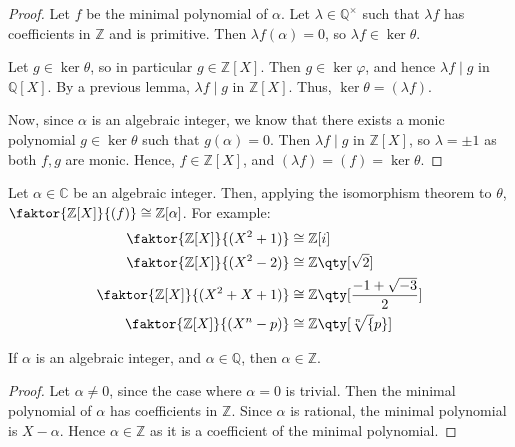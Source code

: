 \begin{proof}
	Let $f$ be the minimal polynomial of $\alpha$.
	Let $\lambda \in \mathbb Q^\times$ such that $\lambda f$ has coefficients in $\mathbb Z$ and is primitive.
	Then $\lambda f(\alpha) = 0$, so $\lambda f \in \ker \theta$.

	Let $g \in \ker \theta$, so in particular $g \in \mathbb Z[X]$.
	Then $g \in \ker \varphi$, and hence $\lambda f \mid g$ in $\mathbb Q[X]$.
	By a previous lemma, $\lambda f \mid g$ in $\mathbb Z[X]$.
	Thus, $\ker \theta = (\lambda f)$.

	Now, since $\alpha$ is an algebraic integer, we know that there exists a monic polynomial $g \in \ker \theta$ such that $g(\alpha) = 0$.
	Then $\lambda f \mid g$ in $\mathbb Z[X]$, so $\lambda = \pm 1$ as both $f, g$ are monic.
	Hence, $f \in \mathbb Z[X]$, and $(\lambda f) = (f) = \ker \theta$.
\end{proof}
Let $\alpha \in \mathbb C$ be an algebraic integer.
Then, applying the isomorphism theorem to $\theta$, $\faktor{\mathbb Z[X]}{(f)} \cong \mathbb Z[\alpha]$.
For example:
\begin{align*}
	\faktor{\mathbb Z[X]}{(X^2 + 1)}     & \cong \mathbb Z[i]                          \\
	\faktor{\mathbb Z[X]}{(X^2 - 2)}     & \cong \mathbb Z\qty[\sqrt{2}]               \\
	\faktor{\mathbb Z[X]}{(X^2 + X + 1)} & \cong \mathbb Z\qty[\frac{-1+\sqrt{-3}}{2}] \\
	\faktor{\mathbb Z[X]}{(X^n - p)}     & \cong \mathbb Z\qty[\sqrt[n]{p}]
\end{align*}
\begin{corollary}
	If $\alpha$ is an algebraic integer, and $\alpha \in \mathbb Q$, then $\alpha \in \mathbb Z$.
\end{corollary}
\begin{proof}
	Let $\alpha \neq 0$, since the case where $\alpha = 0$ is trivial.
	Then the minimal polynomial of $\alpha$ has coefficients in $\mathbb Z$.
	Since $\alpha$ is rational, the minimal polynomial is $X - \alpha$.
	Hence $\alpha \in \mathbb Z$ as it is a coefficient of the minimal polynomial.
\end{proof}
